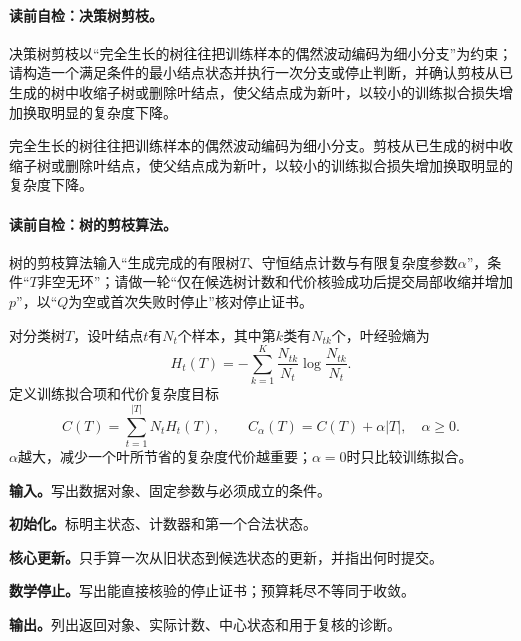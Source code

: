 \paragraph{读前自检：决策树剪枝。}决策树剪枝以“完全生长的树往往把训练样本的偶然波动编码为细小分支”为约束；请构造一个满足条件的最小结点状态并执行一次分支或停止判断，并确认剪枝从已生成的树中收缩子树或删除叶结点，使父结点成为新叶，以较小的训练拟合损失增加换取明显的复杂度下降。\par

完全生长的树往往把训练样本的偶然波动编码为细小分支。剪枝从已生成的树中收缩子树或删除叶结点，使父结点成为新叶，以较小的训练拟合损失增加换取明显的复杂度下降。

\paragraph{读前自检：树的剪枝算法。}树的剪枝算法输入“生成完成的有限树$T$、守恒结点计数与有限复杂度参数$\alpha$”，条件“$T$非空无环”；请做一轮“仅在候选树计数和代价核验成功后提交局部收缩并增加$p$”，以“$Q$为空或首次失败时停止”核对停止证书。\par

对分类树$T$，设叶结点$t$有$N_t$个样本，其中第$k$类有$N_{tk}$个，叶经验熵为
\[
H_t(T)=-\sum_{k=1}^{K}\frac{N_{tk}}{N_t}\log\frac{N_{tk}}{N_t}.
\]
定义训练拟合项和代价复杂度目标
\[
C(T)=\sum_{t=1}^{|T|}N_tH_t(T),\qquad
C_\alpha(T)=C(T)+\alpha|T|,\quad \alpha\ge0.
\]
$\alpha$越大，减少一个叶所节省的复杂度代价越重要；$\alpha=0$时只比较训练拟合。


\begin{keypointbox}[title={给定 的自底向上熵剪枝：五步阅读}]
\textbf{输入。}写出数据对象、固定参数与必须成立的条件。\par
\textbf{初始化。}标明主状态、计数器和第一个合法状态。\par
\textbf{核心更新。}只手算一次从旧状态到候选状态的更新，并指出何时提交。\par
\textbf{数学停止。}写出能直接核验的停止证书；预算耗尽不等同于收敛。\par
\textbf{输出。}列出返回对象、实际计数、中心状态和用于复核的诊断。
\end{keypointbox}


